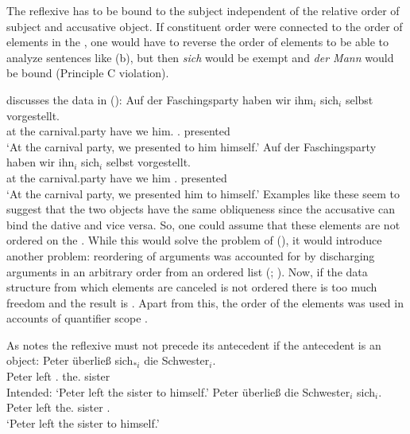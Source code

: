 \documentclass[output=paper
	        ,collection
	        ,collectionchapter
 	        ,biblatex
                ,babelshorthands
                ,newtxmath
                ,draftmode
                ,colorlinks, citecolor=brown
]{langscibook}
\begin{document}
{%
The reflexive has to be bound to the subject independent of the relative order of subject and
accusative object. If constituent order were connected to the order of elements in the \argstl, one
would have to reverse the order of elements to be able to analyze sentences like (b), but
then \emph{sich} would be exempt and \emph{der Mann} would be bound (Principle C violation).

\citet[]{Riezler95a} discusses the data in ():
\eal
\ex
\gll Auf der Faschingsparty haben wir ihm$_i$ {sich$_i$ selbst} vorgestellt.\\
     at the carnival.party have we him.\dat{} \self.\acc{}      presented\\
\glt `At the carnival party, we presented to him himself.'
\ex
\gll Auf der Faschingsparty haben wir ihn$_i$ {sich$_i$ selbst} vorgestellt.\\
     at  the carnival.party have we him\acc{} \self.\dat{}   presented\\
\glt `At the carnival party, we presented him to himself.'
\zl
Examples like these seem to suggest that the two objects have the same obliqueness since the
accusative can bind the dative and vice versa. So, one could assume that these
elements are not ordered on the \argstl \citep[Section~5.2]{AMM2017a-u}.
While this would solve the problem of (), it would
introduce another problem: reordering of arguments was accounted for by discharging arguments in an
arbitrary order from an ordered list (\citealp[Section~2.4]{MuellerHPSGHandbook}; ). Now, if the data
structure from which elements are canceled is not ordered there is too much freedom and the result
is . Apart from this, the order of the elements was used in accounts of
quantifier scope \citep{Kiss2001a}.

As \citet[]{Grewendorf85a} notes the reflexive must not precede its antecedent if the
antecedent is an object:
\eal
\ex 
\gll Peter überließ sich$_{*i}$ die Schwester$_i$.\\
     Peter left     \self.\dat{} the.\acc{} sister\\
\glt Intended: `Peter left the sister to himself.'
\ex 
\gll Peter überließ die Schwester$_i$ sich$_i$.\\
     Peter left     the.\acc{} sister \self.\dat{}\\
\glt `Peter left the sister to himself.'
\zl 

}
\end{document}
